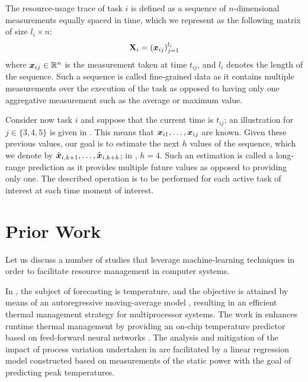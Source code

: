The resource-usage trace of task $i$ is defined as a sequence of $n$-dimensional
measurements equally spaced in time, which we represent as the following matrix
of size $l_i \times n$:
\[
  \mathbf{X}_i = (\boldsymbol{x}_{ij})_{j = 1}^{l_i}
\]
where $\boldsymbol{x}_{ij} \in \mathbb{R}^n$ is the measurement taken at time $t_{ij}$, and
$l_i$ denotes the length of the sequence. Such a sequence is called fine-grained
data as it contains multiple measurements over the execution of the task as
opposed to having only one aggregative measurement such as the average or
maximum value.

Consider now task $i$ and suppose that the current time is $t_{ij}$; an
illustration for $j \in \{3, 4, 5\}$ is given in . This
means that $\boldsymbol{x}_{i1}, \dots, \boldsymbol{x}_{ij}$ are known. Given these previous values,
our goal is to estimate the next $h$ values of the sequence, which we denote by
$\hat{\boldsymbol{x}}_{i,k + 1}, \dots, \hat{\boldsymbol{x}}_{i,k + h}$; in ,
$h = 4$. Such an estimation is called a long-range prediction as it provides
multiple future values as opposed to providing only one. The described operation
is to be performed for each active task of interest at each time moment of
interest.

\section{Prior Work}

Let us discuss a number of studies that leverage machine-learning techniques in
order to facilitate resource management in computer systems.

In \cite{coskun2008}, the subject of forecasting is temperature, and the
objective is attained by means of an autoregressive moving-average model
\cite{hastie2013}, resulting in an efficient thermal management strategy for
multiprocessor systems. The work in \cite{kumar2010} enhances runtime thermal
management by providing an on-chip temperature predictor based on feed-forward
neural networks \cite{hastie2013}. The analysis and mitigation of the impact of
process variation undertaken in \cite{juan2014} are facilitated by a linear
regression model \cite{hastie2013} constructed based on measurements of the
static power with the goal of predicting peak temperatures.

